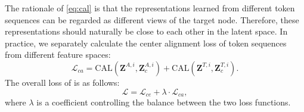 The rationale of \autoref{eq:cal} is that the representations learned from different token sequences can be regarded as different views of the target node.
Therefore, these representations should naturally be close to each other in the latent space.
In practice, we separately calculate the center alignment loss of token sequences from different feature spaces:
\begin{equation}
        \mathcal{L}_{ca} = \mathrm{CAL}(\mathbf{Z}^{A,i}, \mathbf{Z}^{A,i}_c) + \mathrm{CAL}(\mathbf{Z}^{T,i}, \mathbf{Z}^{T,i}_c).
    \label{eq:calloss}
\end{equation}
The overall loss of \name is as follows:
\begin{equation}
        \mathcal{L} = \mathcal{L}_{ce} + \lambda\cdot\mathcal{L}_{ca},
    \label{eq:allloss}
\end{equation}
where $\lambda$ is a coefficient controlling the balance between the two loss functions.